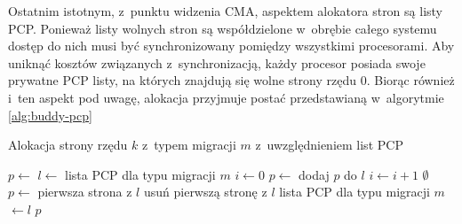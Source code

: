 Ostatnim istotnym, z~punktu widzenia CMA, aspektem alokatora stron są
listy PCP.  Ponieważ listy wolnych stron są współdzielone w~obrębie
całego systemu dostęp do nich musi być synchronizowany pomiędzy
wszystkimi procesorami.  Aby uniknąć kosztów związanych
z~synchronizacją, każdy procesor posiada swoje prywatne PCP listy, na
których znajdują się wolne strony rzędu 0.  Biorąc również i~ten
aspekt pod uwagę, alokacja przyjmuje postać przedstawianą w~algorytmie
\ref{alg:buddy-pcp}

\begin{algorithm}\label{alg:buddy-pcp}
\caption{Alokacja strony rzędu $k$ z~typem migracji $m$
  z~uwzględnieniem list PCP}
\begin{algorithmic}[1]
        \State $p \gets$ 
    \Else
        \State $l \gets$ lista PCP dla typu migracji $m$
            \State $i \gets 0$
            \Repeat
                \State $p \gets$ 
                    \State dodaj $p$ do $l$
                    \State $i \gets i + 1$
                \EndIf
             
        \EndIf
            \State \Return $\emptyset$
        \Else
            \State $p \gets$ pierwsza strona z $l$
            \State usuń pierwszą stronę z $l$
            \State lista PCP dla typu migracji $m$ $\gets l$
        \EndIf
    \EndIf
    \State \Return $p$
\EndFunction
\end{algorithmic}
\end{algorithm}
